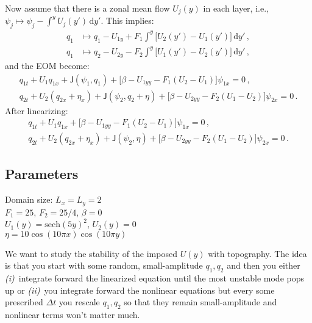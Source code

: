 \documentclass[10pt]{article}
\newcommand{\dd}{\mathrm{d}}
\newcommand{\com}{\, ,}
\newcommand{\per}{\, .}
\newcommand{\h}{\eta}
\newcommand{\ao}{\alpha_1}
\newcommand{\at}{\alpha_2}
\renewcommand{\ao}{F_2}
\renewcommand{\at}{F_1}
\newcommand{\J}{\mathsf{J}}
\begin{document}
Now assume that there is a zonal mean flow $U_j(y)$ in each layer, i.e.,~$\psi_j\mapsto \psi_j - \int^y U_j(y')\,\dd y'$. This implies:\begin{subequations}
\begin{align}
	q_1 &\mapsto q_1 - U_{1y} + \at\int^{y} \big[U_2(y')-U_1(y')\big]\,\dd y' \com\\
	q_1 &\mapsto q_2 - U_{2y} - \ao\int^{y} \big[U_1(y')-U_2(y')\big]\,\dd y'\com
\end{align}\end{subequations}
and the EOM become:\begin{subequations}
\begin{gather}
	q_{1t} + U_1 q_{1x} + \J(\psi_1, q_1) + \big[ \beta-U_{1yy} - \at (U_2-U_1)\big]\psi_{1x} = 0\com\label{eq:Uq1t} \\
	q_{2t} + U_2 (q_{2x} + \h_x) + \J(\psi_2, q_2 +  \h) + \big[\beta -U_{2yy} - \ao(U_1-U_2)\big] \psi_{2x} = 0\per\label{eq:Uq2t} 
\end{gather}\end{subequations}
After linearizing:\begin{subequations}
\begin{gather}
	q_{1t} + U_1 q_{1x} + \big[ \beta-U_{1yy} - \at (U_2-U_1)\big]\psi_{1x} = 0\com\label{eq:linUq1t} \\
	q_{2t} + U_2 (q_{2x} + \h_x) + \J(\psi_2, \h) + \big[\beta-U_{2yy}  - \ao(U_1-U_2)\big] \psi_{2x} = 0\per\label{eq:linUq2t} 
\end{gather}\label{eqs:lin2layer}\end{subequations}

\subsection*{Parameters}

\noindent Domain size: $L_x=L_y=2$\\
$F_1=25$, $F_2=25/4$, $\beta=0$\\
$U_1(y) = \mathrm{sech}{(5y)}^2$, $U_2(y)=0$\\
$\h = 10\cos{(10\pi x)}\cos{(10\pi y)}$ 

\vspace{1em}

We want to study the stability of the imposed $U(y)$ with topography. The idea is that you start with some random, small-amplitude $q_1, q_2$ and then you either \emph{(i)}~integrate forward the linearized equation until the most unstable mode pops up or \emph{(ii)}~you integrate forward the nonlinear equations but every some prescribed $\Delta t$ you rescale $q_1, q_2$ so that they remain small-amplitude and nonlinear terms won't matter much.
\end{document}
